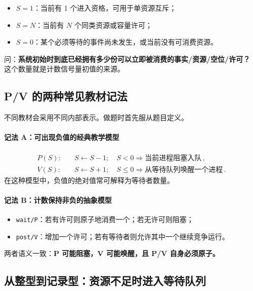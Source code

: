 \documentclass[11pt,a4paper]{ctexart}
\newcommand{\kw}[1]{\textbf{#1}}
\newcommand{\code}[1]{\texttt{#1}}
\begin{document}
\begin{itemize}
\item $S=1$：当前有 1 个进入资格，可用于单资源互斥；
\item $S=N$：当前有 $N$ 个同类资源或容量许可；
\item $S=0$：某个必须等待的事件尚未发生，或当前没有可消费资源。
\end{itemize}

\begin{center}

\end{center}

\begin{corebox}[初值不是背出来的]
问：\kw{系统初始时到底已经拥有多少份可以立即被消费的事实/资源/空位/许可？} 这个数量就是计数信号量初值的来源。
\end{corebox}

\subsection{P/V 的两种常见教材记法}

不同教材会采用不同内部表示。做题时首先服从题目定义。

\paragraph{记法 A：可出现负值的经典教学模型}
\begin{align*}
P(S):&\quad S\leftarrow S-1;\quad S<0\Rightarrow\text{当前进程阻塞入队}\,,\\
V(S):&\quad S\leftarrow S+1;\quad S\le 0\Rightarrow\text{从等待队列唤醒一个进程}\,.
\end{align*}
在这种模型中，负值的绝对值常可解释为等待者数量。

\paragraph{记法 B：计数保持非负的抽象模型}
\begin{itemize}
\item \code{wait/P}：若有许可则原子地消费一个；若无许可则阻塞；
\item \code{post/V}：增加一个许可；若有等待者则允许其中一个继续竞争运行。
\end{itemize}

两者语义一致：\kw{P 可能阻塞，V 可能唤醒，且 P/V 自身必须原子。}

\subsection{从整型到记录型：资源不足时进入等待队列}
\end{document}
